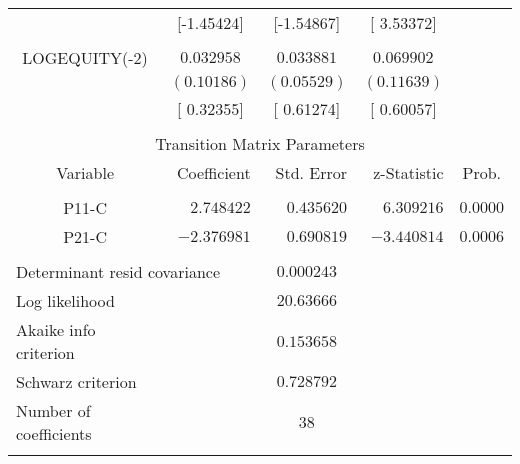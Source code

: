 \begin{tabular}{lrrrr}
\multicolumn{1}{c}{}&\multicolumn{1}{c}{[-1.45424]}&\multicolumn{1}{c}{[-1.54867]}&\multicolumn{1}{c}{[ 3.53372]}&\multicolumn{1}{c}{}\\
\multicolumn{1}{c}{}&\multicolumn{1}{c}{}&\multicolumn{1}{c}{}&\multicolumn{1}{c}{}&\multicolumn{1}{c}{}\\
\multicolumn{1}{c}{LOGEQUITY(-2)}&\multicolumn{1}{c}{$0.032958$}&\multicolumn{1}{c}{$0.033881$}&\multicolumn{1}{c}{$0.069902$}&\multicolumn{1}{c}{}\\
\multicolumn{1}{c}{}&\multicolumn{1}{c}{$(0.10186)$}&\multicolumn{1}{c}{$(0.05529)$}&\multicolumn{1}{c}{$(0.11639)$}&\multicolumn{1}{c}{}\\
\multicolumn{1}{c}{}&\multicolumn{1}{c}{[ 0.32355]}&\multicolumn{1}{c}{[ 0.61274]}&\multicolumn{1}{c}{[ 0.60057]}&\multicolumn{1}{c}{}\\
[4.5pt] \hline \\ [-4.5pt]
\multicolumn{5}{c}{Transition Matrix Parameters}\\
\multicolumn{1}{c}{Variable}&\multicolumn{1}{r}{Coefficient}&\multicolumn{1}{r}{Std. Error}&\multicolumn{1}{r}{z-Statistic}&\multicolumn{1}{c}{Prob.}\\
[4.5pt] \hline \\ [-4.5pt]
\multicolumn{1}{c}{P11-C}&\multicolumn{1}{r}{$2.748422$}&\multicolumn{1}{r}{$0.435620$}&\multicolumn{1}{r}{$6.309216$}&\multicolumn{1}{c}{$0.0000$}\\
\multicolumn{1}{c}{P21-C}&\multicolumn{1}{r}{$-2.376981$}&\multicolumn{1}{r}{$0.690819$}&\multicolumn{1}{r}{$-3.440814$}&\multicolumn{1}{c}{$0.0006$}\\
[4.5pt] \hline \\ [-4.5pt]
\multicolumn{2}{l}{Determinant resid covariance}&\multicolumn{1}{c}{$0.000243$}&\multicolumn{1}{c}{}&\multicolumn{1}{c}{}\\
\multicolumn{1}{l}{Log likelihood}&\multicolumn{1}{c}{}&\multicolumn{1}{c}{$20.63666$}&\multicolumn{1}{c}{}&\multicolumn{1}{c}{}\\
\multicolumn{1}{l}{Akaike info criterion}&\multicolumn{1}{c}{}&\multicolumn{1}{c}{$0.153658$}&\multicolumn{1}{c}{}&\multicolumn{1}{c}{}\\
\multicolumn{1}{l}{Schwarz criterion}&\multicolumn{1}{c}{}&\multicolumn{1}{c}{$0.728792$}&\multicolumn{1}{c}{}&\multicolumn{1}{c}{}\\
\multicolumn{1}{l}{Number of coefficients}&\multicolumn{1}{c}{}&\multicolumn{1}{c}{$38$}&\multicolumn{1}{c}{}&\multicolumn{1}{c}{}\\
[4.5pt] \hline \\ [-4.5pt]
\end{tabular}